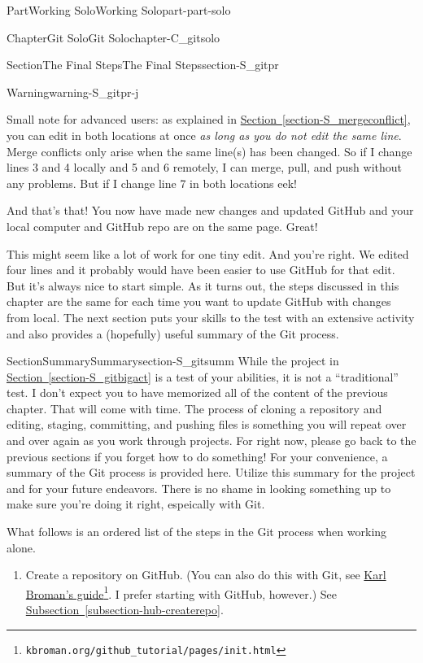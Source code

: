 \documentclass[oneside,10pt,]{book}
\newcommand{\xreffont}{\relax}
\begin{document}
\begin{partptx}{Part}{Working Solo}{}{Working Solo}{}{}{part-part-solo}
\begin{chapterptx}{Chapter}{Git Solo}{}{Git Solo}{}{}{chapter-C_gitsolo}
\begin{sectionptx}{Section}{The Final Steps}{}{The Final Steps}{}{}{section-S_gitpr}
\begin{warning}{Warning}{}{warning-S_gitpr-j}
\par
Small note for advanced users: as explained in \hyperref[section-S_mergeconflict]{Section~{\xreffont\ref{section-S_mergeconflict}}}, you can edit in both locations at once \emph{as long as you do not edit the same line}. Merge conflicts only arise when the same line(s) has been changed. So if I change lines 3 and 4 locally and 5 and 6 remotely, I can merge, pull, and push without any problems. But if I change line 7 in both locations \textellipsis{} eek!%
\end{warning}
And that's that! You now have made new changes and updated GitHub and your local computer and GitHub repo are on the same page. Great!%
\par
This might seem like a lot of work for one tiny edit. And you're right. We edited four lines and it probably would have been easier to use GitHub for that edit. But it's always nice to start simple. As it turns out, the steps discussed in this chapter are the same for each time you want to update GitHub with changes from local. The next section puts your skills to the test with an extensive activity and also provides a (hopefully) useful summary of the Git process.%
\end{sectionptx}
%
%
\typeout{************************************************}
\typeout{************************************************}
%
\begin{sectionptx}{Section}{Summary}{}{Summary}{}{}{section-S_gitsumm}
%
While the project in \hyperref[section-S_gitbigact]{Section~{\xreffont\ref{section-S_gitbigact}}} is a test of your abilities, it is not a ``traditional'' test. I don't expect you to have memorized all of the content of the previous chapter. That will come with time. The process of cloning a repository and editing, staging, committing, and pushing files is something you will repeat over and over again as you work through projects. For right now, please go back to the previous sections if you forget how to do something! For your convenience, a summary of the Git process is provided here. Utilize this summary for the project and for your future endeavors. There is no shame in looking something up to make sure you're doing it right, espeically with Git.%
\par
What follows is an ordered list of the steps in the Git process when working alone.%
\begin{enumerate}
\item{}Create a repository on GitHub. (You can also do this with Git, see \href{https://kbroman.org/github_tutorial/pages/init.html}{Karl Broman's guide}\footnote{\nolinkurl{kbroman.org/github_tutorial/pages/init.html}\label{fn-S_gitsumm-d-a-a-a-b}}. I prefer starting with GitHub, however.) See \hyperref[subsection-hub-createrepo]{Subsection~{\xreffont\ref{subsection-hub-createrepo}}}.%

\end{enumerate}
\end{sectionptx}
\end{chapterptx}
\end{partptx}
\end{document}
